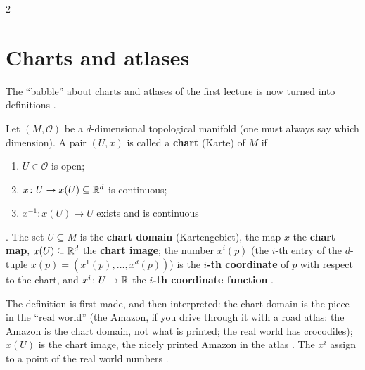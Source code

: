 \begin{paracol}{2}
\section{Charts and atlases}\label{sec:tm-charts}

The ``babble'' about charts and atlases of the first lecture is now turned into definitions
.

\begin{definition}\label{def:tm-chart}
Let $(M,\mathcal O)$ be a $d$-dimensional topological manifold (one must always say which dimension). A pair
$(U,x)$ is called a \textbf{chart} (Karte) of $M$ if 
\begin{enumerate}
  \item $U\in\mathcal O$ is open;
  \item $x\colon U\to x(U)\subseteq\mathbb{R}^d$ is continuous;
  \item $x^{-1}\colon x(U)\to U$ exists and is continuous
\end{enumerate}
. The set $U\subseteq M$ is the \textbf{chart domain} (Kartengebiet), the map $x$
the \textbf{chart map}, $x(U)\subseteq\mathbb{R}^d$ the \textbf{chart image}; the number $x^i(p)$ (the $i$-th entry of the
$d$-tuple $x(p)=(x^1(p),\dots,x^d(p))$) is the \textbf{$i$-th coordinate} of $p$ with respect to the chart, and
$x^i\colon U\to\mathbb{R}$ the \textbf{$i$-th coordinate function} .
\end{definition}
The definition is first made, and then interpreted: the chart domain is the piece in the ``real world'' (the Amazon,
if you drive through it with a road atlas: the Amazon is the chart domain, not what is printed; the real world has
crocodiles); $x(U)$ is the chart image, the nicely printed Amazon in the atlas .
The $x^i$ assign to a point of the real world numbers .


\end{paracol}
